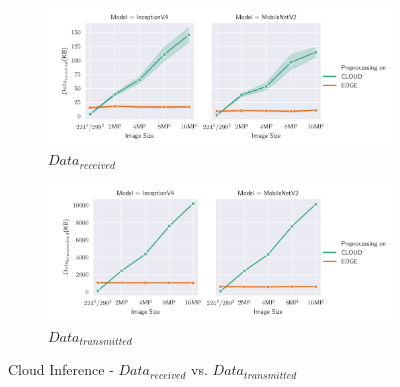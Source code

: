 \begin{figure}[!htb]
\centering
\begin{subfigure}[b]{0.95\textwidth}
   \includegraphics[width=1\linewidth]{./Bilder/single_plots/cloud_inference_plots/Cloud_Inference_Received_Data.pdf}
   \caption{$Data_{received}$}
   \label{fig:CloudInferenceReceivedData} 
\end{subfigure}

\begin{subfigure}[b]{0.95\textwidth}
   \includegraphics[width=1\linewidth]{./Bilder/single_plots/cloud_inference_plots/Cloud_Inference_Transmitted_Data.pdf}
   \caption{$Data_{transmitted}$}
   \label{fig:CloudInferenceTransmittedData}
\end{subfigure}

\caption{Cloud Inference -  $Data_{received}$ vs. $Data_{transmitted}$}
\end{figure}

\FloatBarrier
